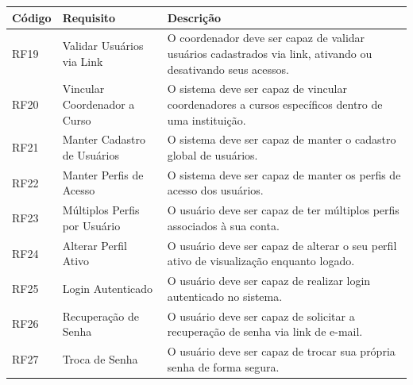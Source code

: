 \newpage
\begin{longtable}{|C{1.8cm}|L{4.5cm}|L{7.1cm}|}
\hline
\textbf{Código} & \textbf{Requisito} & \textbf{Descrição} \\
\hline
\endhead
RF19 & Validar Usuários via Link & O coordenador deve ser capaz de validar usuários cadastrados via link, ativando ou desativando seus acessos. \\
\hline
RF20 & Vincular Coordenador a Curso & O sistema deve ser capaz de vincular coordenadores a cursos específicos dentro de uma instituição. \\
\hline
RF21 & Manter Cadastro de Usuários & O sistema deve ser capaz de manter o cadastro global de usuários. \\
\hline
RF22 & Manter Perfis de Acesso & O sistema deve ser capaz de manter os perfis de acesso dos usuários. \\
\hline
RF23 & Múltiplos Perfis por Usuário & O usuário deve ser capaz de ter múltiplos perfis associados à sua conta. \\
\hline
RF24 & Alterar Perfil Ativo & O usuário deve ser capaz de alterar o seu perfil ativo de visualização enquanto logado. \\
\hline
RF25 & Login Autenticado & O usuário deve ser capaz de realizar login autenticado no sistema. \\
\hline
RF26 & Recuperação de Senha & O usuário deve ser capaz de solicitar a recuperação de senha via link de e-mail. \\
\hline
RF27 & Troca de Senha & O usuário deve ser capaz de trocar sua própria senha de forma segura. \\
\hline
\end{longtable}

